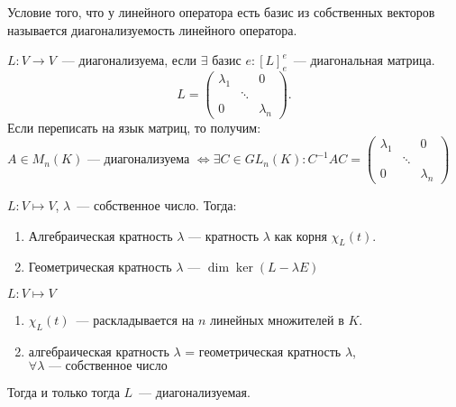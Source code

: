 \begin{remark}
    Условие того, что у линейного оператора есть базис из собственных векторов называется диагонализуемость линейного оператора.
\end{remark}
\begin{definition}
    $L\colon V \to V$~--- диагонализуема, если $\exists$ базис $e\colon [L]^e_e$~--- диагональная матрица.
    \[
        L = 
        \begin{pmatrix}
            \lambda_1&&0\\
            &\ddots &\\
            0& & \lambda_n
        \end{pmatrix}
    .\] 
    Если переписать на язык матриц, то получим: \\ $A\in M_n(K)$ --- диагонализуема $\Leftrightarrow \exists C\in GL_n(K) \colon C^{-1}AC = 
    \begin{pmatrix}
        \lambda_1&&0\\
        &\ddots &\\
        0& & \lambda_n
    \end{pmatrix} $
\end{definition}
\newpage
\begin{definition}
    $L\colon V\mapsto V$, $\lambda$~--- собственное число. Тогда:
    \begin{enumerate}
        \item Алгебраическая кратность $\lambda$ --- 
            кратность  $\lambda$ как корня $\chi_L(t)$.
        \item Геометрическая кратность $\lambda$ ---
            $\dim \ker (L-\lambda E)$
    \end{enumerate}
\end{definition}
\begin{theorem}
    $L\colon V\mapsto V$ 
    \begin{enumerate}
        \item $\chi_L(t)$~--- раскладывается на $n$ линейных множителей в $K$.
        \item алгебраическая кратность $\lambda$ = геометрическая кратность $\lambda$, $\forall\lambda\text{~--- собственное число}$ 
    \end{enumerate}
    Тогда и только тогда $L$~--- диагонализуемая.
\end{theorem}
